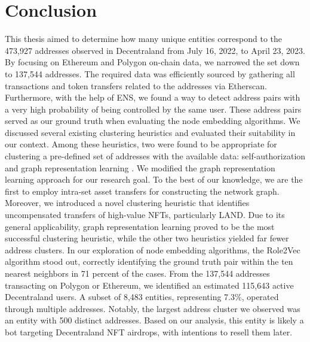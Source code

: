 \documentclass[12pt,a4paper,titlepage,oneside,english]{article}
\begin{document}
\section{Conclusion}
This thesis aimed to determine how many unique entities correspond to the 473,927 addresses observed in Decentraland from July 16, 2022, to April 23, 2023. \newline
By focusing on Ethereum and Polygon on-chain data, we narrowed the set down to 137,544 addresses. The required data was efficiently sourced by gathering all transactions and token transfers related to the addresses via Etherscan. Furthermore, with the help of ENS, we found a way to detect address pairs with a very high probability of being controlled by the same user. These address pairs served as our ground truth when evaluating the node embedding algorithms. \newline
We discussed several existing clustering heuristics and evaluated their suitability in our context. Among these heuristics, two were found to be appropriate for clustering a pre-defined set of addresses with the available data: self-authorization \citep{FV:17} and graph representation learning \citep{Beres2020}. We modified the graph representation learning approach for our research goal. %
To the best of our knowledge, we are the first to employ intra-set asset transfers for constructing the network graph. Moreover, we introduced a novel clustering heuristic that identifies uncompensated transfers of high-value NFTs, particularly LAND. \newline
Due to its general applicability, graph representation learning proved to be the most successful clustering heuristic, while the other two heuristics yielded far fewer address clusters. In our exploration of node embedding algorithms, the Role2Vec algorithm stood out, correctly identifying the ground truth pair within the ten nearest neighbors in 71 percent of the cases. \newline
From the 137,544 addresses transacting on Polygon or Ethereum, we identified an estimated 115,643 active Decentraland users. A subset of 8,483 entities, representing 7.3\%, operated through multiple addresses. Notably, the largest address cluster we observed was an entity with 500 distinct addresses. Based on our analysis, this entity is likely a bot targeting Decentraland NFT airdrops, with intentions to resell them later. \newline
\end{document}
